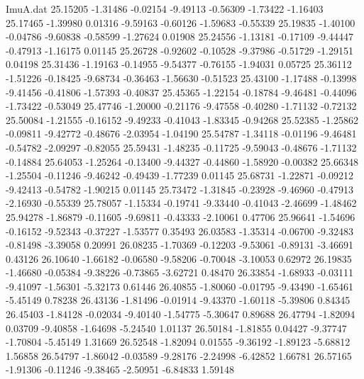 \begin{filecontents}{ImuA.dat}
  25.15205   -1.31486   -0.02154   -9.49113   -0.56309   -1.73422   -1.16403
  25.17465   -1.39980    0.01316   -9.59163   -0.60126   -1.59683   -0.55339
  25.19835   -1.40100   -0.04786   -9.60838   -0.58599   -1.27624    0.01908
  25.24556   -1.13181   -0.17109   -9.44447   -0.47913   -1.16175    0.01145
  25.26728   -0.92602   -0.10528   -9.37986   -0.51729   -1.29151    0.04198
  25.31436   -1.19163   -0.14955   -9.54377   -0.76155   -1.94031    0.05725
  25.36112   -1.51226   -0.18425   -9.68734   -0.36463   -1.56630   -0.51523
  25.43100   -1.17488   -0.13998   -9.41456   -0.41806   -1.57393   -0.40837
  25.45365   -1.22154   -0.18784   -9.46481   -0.44096   -1.73422   -0.53049
  25.47746   -1.20000   -0.21176   -9.47558   -0.40280   -1.71132   -0.72132
  25.50084   -1.21555   -0.16152   -9.49233   -0.41043   -1.83345   -0.94268
  25.52385   -1.25862   -0.09811   -9.42772   -0.48676   -2.03954   -1.04190
  25.54787   -1.34118   -0.01196   -9.46481   -0.54782   -2.09297   -0.82055
  25.59431   -1.48235   -0.11725   -9.59043   -0.48676   -1.71132   -0.14884
  25.64053   -1.25264   -0.13400   -9.44327   -0.44860   -1.58920   -0.00382
  25.66348   -1.25504   -0.11246   -9.46242   -0.49439   -1.77239    0.01145
  25.68731   -1.22871   -0.09212   -9.42413   -0.54782   -1.90215    0.01145
  25.73472   -1.31845   -0.23928   -9.46960   -0.47913   -2.16930   -0.55339
  25.78057   -1.15334   -0.19741   -9.33440   -0.41043   -2.46699   -1.48462
  25.94278   -1.86879   -0.11605   -9.69811   -0.43333   -2.10061    0.47706
  25.96641   -1.54696   -0.16152   -9.52343   -0.37227   -1.53577    0.35493
  26.03583   -1.35314   -0.06700   -9.32483   -0.81498   -3.39058    0.20991
  26.08235   -1.70369   -0.12203   -9.53061   -0.89131   -3.46691    0.43126
  26.10640   -1.66182   -0.06580   -9.58206   -0.70048   -3.10053    0.62972
  26.19835   -1.46680   -0.05384   -9.38226   -0.73865   -3.62721    0.48470
  26.33854   -1.68933   -0.03111   -9.41097   -1.56301   -5.32173    0.61446
  26.40855   -1.80060   -0.01795   -9.43490   -1.65461   -5.45149    0.78238
  26.43136   -1.81496   -0.01914   -9.43370   -1.60118   -5.39806    0.84345
  26.45403   -1.84128   -0.02034   -9.40140   -1.54775   -5.30647    0.89688
  26.47794   -1.82094    0.03709   -9.40858   -1.64698   -5.24540    1.01137
  26.50184   -1.81855    0.04427   -9.37747   -1.70804   -5.45149    1.31669
  26.52548   -1.82094    0.01555   -9.36192   -1.89123   -5.68812    1.56858
  26.54797   -1.86042   -0.03589   -9.28176   -2.24998   -6.42852    1.66781
  26.57165   -1.91306   -0.11246   -9.38465   -2.50951   -6.84833    1.59148

\end{filecontents}
